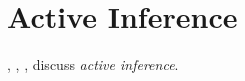 \chapter{Active Inference}

\noindent \cite{friston2011action}, \cite{friston2013anatomy} , \cite{friston2015active} \cite{friston2016active_process}, \cite{friston2016active} discuss \textit{active inference}.

